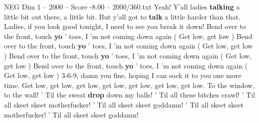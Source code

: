 \begin{textsample}{NEG Dim 1 – 2000 – Score -8.00 – 2000/360.txt}
Yeah!
Y'all ladies \textbf{talking} a little bit out there, a little bit.
But y'all got to \textbf{talk} a little harder than that.
Ladies, if you look good tonight, I need to see you break it down!
Bend over to the front, touch \textbf{yo} ' toes, I 'm not coming down again ( Get low, get low ) Bend over to the front, touch \textbf{yo} ' toes, I 'm not coming down again ( Get low, get low ) Bend over to the front, touch \textbf{yo} ' toes, I 'm not coming down again ( Get low, get low ) Bend over to the front, touch \textbf{yo} ' toes, I 'm not coming down again ( Get low, get low ) 3-6-9, damn you fine, hoping I can sock it to you one more time.
Get low, get low, get low, get low, get low, get low, get low.
To the window, to the wall! ' Til the sweat \textbf{drop} down my balls! ' Til all these bitches crawl! ' Til all skeet skeet motherfucker! ' Til all skeet skeet goddamn! ' Til all skeet skeet motherfucker! ' Til all skeet skeet goddamn!

\end{textsample}
